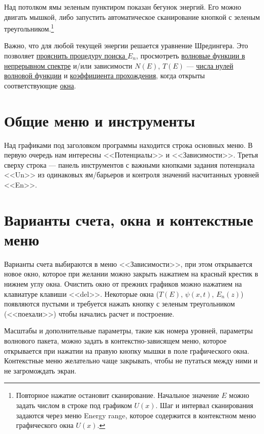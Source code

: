 \documentclass[12pt]{article}
\begin{document}
Над потолком ямы зеленым пунктиром показан бегунок энергий. Его можно двигать мышкой, либо запустить автоматическое сканирование кнопкой с зеленым треугольником.\footnote[5]{Повторное нажатие остановит сканирование. Начальное значение $E$ можно задать числом в строке под графиком $U(x)$.  Шаг и интервал сканирования задаются через меню Energy range, которое содержится в контекстном меню графического окна $U(x)$.}

Важно, что для любой текущей энергии решается уравнение Шредингера. Это позволяет \hyperlink{psinx_psix} {прояснить процедуру поиска $E_n$}, просмотреть \hyperlink{psixE} {волновые функции в непрерывном спектре}
 и/или зависимости $N(E)$, $T(E)$ --- \hyperlink{zerosOfPsin}{числа нулей волновой функции} и \hyperlink{PsiandTE} {коэффициента прохождения},
когда открыты соответствующие \hyperlink{menu2} {окна}.


\hypertarget{menu1}{}\section{Общие меню и инструменты}
Над графиками под заголовком программы находится строка
основных меню. В первую очередь нам интересны <<Потенциалы>> и  <<Зависимости>>.
Третья сверху строка --- панель инструментов с важными
кнопками
задания потенциала <<Un>> из одинаковых ям/барьеров и контроля значений насчитанных уровней <<En>>.

\hypertarget{menu2}{}\section{Варианты счета, окна и контекстные меню}
Варианты счета выбираются в меню <<Зависимости>>, при этом открывается новое
окно, которое при желании можно закрыть нажатием на красный крестик в нижнем углу окна. Очистить окно от прежних графиков можно нажатием на клавиатуре
клавиши <<del>>. Некоторые окна (\hyperlink{PsiandTE}{$T(E)$}, \hyperlink{psixt}{$\psi(x,t)$}, \hyperlink{Uz}{$E_n(z)$})  появляются пустыми и требуется
нажать кнопку с зеленым треугольником (<<поехали>>) чтобы начались расчет и построение.

 Масштабы и дополнительные параметры,
такие как номера уровней, параметры волнового пакета, можно задать в
контекст\-но-зависящем меню, которое открывается при нажатии на правую кнопку
мышки в поле графического окна. Контекстные меню желательно чаще закрывать, чтобы не путаться между ними и не загромождать экран.
\end{document}
